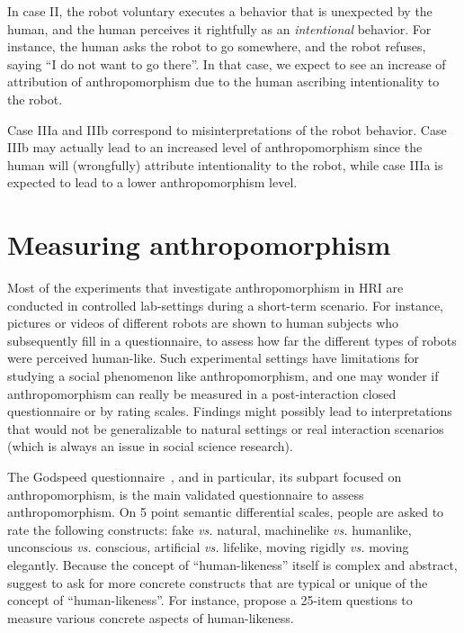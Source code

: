 \documentclass{frontiersSCNS} %
\newcommand{\vs}{\textit{vs.}\xspace}
\begin{document}
In case II, the robot voluntary executes a behavior that is unexpected by the
human, and the human perceives it rightfully as an \emph{intentional} behavior.
For instance, the human asks the robot to go somewhere, and the robot refuses,
saying ``I do not want to go there''. In that case, we expect to see an increase
of attribution of anthropomorphism due to the human ascribing intentionality to
the robot.

Case IIIa and IIIb correspond to misinterpretations of the robot behavior. Case
IIIb may actually lead to an increased level of anthropomorphism since the human
will (wrongfully) attribute intentionality to the robot, while case IIIa is
expected to lead to a lower anthropomorphism level.

%
%
%
%
%
%

\section{Measuring anthropomorphism}
\label{sec:measuring}

Most of the experiments that investigate anthropomorphism in HRI are conducted
in controlled lab-settings during a short-term scenario. For instance, pictures
or videos of different robots are shown to human subjects who subsequently fill
in a questionnaire, to assess how far the different types of robots were
perceived human-like. Such experimental settings have limitations for studying a
social phenomenon like anthropomorphism, and one may wonder if anthropomorphism
can really be measured in a post-interaction closed questionnaire or by rating
scales. Findings might possibly lead to interpretations that would not be
generalizable to natural settings or real interaction scenarios (which is always
an issue in social science research).

The Godspeed questionnaire~\citep{bartneck_measurement_2008}, and in particular,
its subpart focused on anthropomorphism, is the main validated questionnaire to
assess anthropomorphism. On 5 point semantic differential scales, people are
asked to rate the following constructs: fake \vs natural, machinelike \vs
humanlike, unconscious \vs conscious, artificial \vs lifelike, moving rigidly
\vs moving elegantly. Because the concept of ``human-likeness'' itself is
complex and abstract, \cite{kahn_jr._robotic_2006} suggest to ask for more
concrete constructs that are typical or unique of the concept of
``human-likeness''.  For instance, \cite{ruijten_introducing_2014} propose a
25-item questions to measure various concrete aspects of human-likeness.
\end{document}
